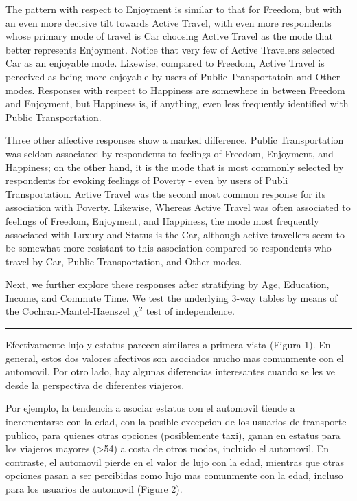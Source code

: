 \documentclass[]{elsarticle} %
\begin{document}
The pattern with respect to Enjoyment is similar to that for Freedom,
but with an even more decisive tilt towards Active Travel, with even
more respondents whose primary mode of travel is Car choosing Active
Travel as the mode that better represents Enjoyment. Notice that very
few of Active Travelers selected Car as an enjoyable mode. Likewise,
compared to Freedom, Active Travel is perceived as being more enjoyable
by users of Public Transportatoin and Other modes. Responses with
respect to Happiness are somewhere in between Freedom and Enjoyment, but
Happiness is, if anything, even less frequently identified with Public
Transportation.

Three other affective responses show a marked difference. Public
Transportation was seldom associated by respondents to feelings of
Freedom, Enjoyment, and Happiness; on the other hand, it is the mode
that is most commonly selected by respondents for evoking feelings of
Poverty - even by users of Publi Transportation. Active Travel was the
second most common response for its association with Poverty. Likewise,
Whereas Active Travel was often associated to feelings of Freedom,
Enjoyment, and Happiness, the mode most frequently associated with
Luxury and Status is the Car, although active travellers seem to be
somewhat more resistant to this association compared to respondents who
travel by Car, Public Transportation, and Other modes.

Next, we further explore these responses after stratifying by Age,
Education, Income, and Commute Time. We test the underlying 3-way tables
by means of the Cochran-Mantel-Haenszel \(\chi^2\) test of independence.

\begin{center}\rule{0.5\linewidth}{\linethickness}\end{center}

Efectivamente lujo y estatus parecen similares a primera vista (Figura
1). En general, estos dos valores afectivos son asociados mucho mas
comunmente con el automovil. Por otro lado, hay algunas diferencias
interesantes cuando se les ve desde la perspectiva de diferentes
viajeros.

Por ejemplo, la tendencia a asociar estatus con el automovil tiende a
incrementarse con la edad, con la posible excepcion de los usuarios de
transporte publico, para quienes otras opciones (posiblemente taxi),
ganan en estatus para los viajeros mayores (\textgreater{}54) a costa de
otros modos, incluido el automovil. En contraste, el automovil pierde en
el valor de lujo con la edad, mientras que otras opciones pasan a ser
percibidas como lujo mas comunmente con la edad, incluso para los
usuarios de automovil (Figure 2).
\end{document}
